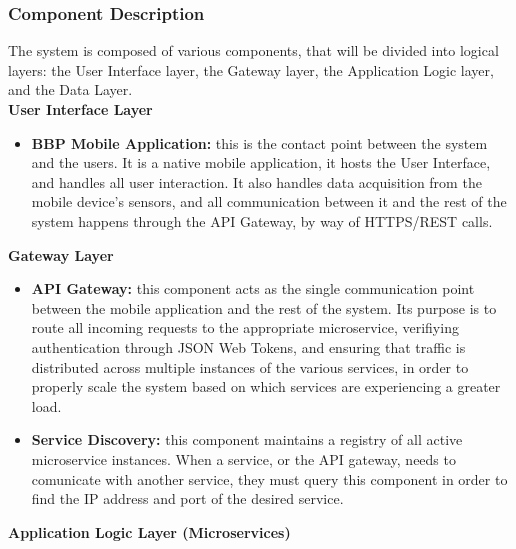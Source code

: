 \subsubsection{Component Description}
The system is composed of various components, that will be divided into logical layers: 
the User Interface layer, the Gateway layer, the Application Logic layer, and the Data Layer.\\
\newline
\textbf{User Interface Layer}
\begin{itemize}
    \item \textbf{BBP Mobile Application:} this is the contact point between the system and the users.
    It is a native mobile application, it hosts the User Interface, and handles all user interaction. It also handles data
    acquisition from the mobile device's sensors, and all communication between it and
    the rest of the system happens through the API Gateway, by way of HTTPS/REST calls.\\
\end{itemize}
\textbf{Gateway Layer}
\begin{itemize}
    \item \textbf{API Gateway:} this component acts as the single communication point
    between the mobile application and the rest of the system. Its purpose is to route
    all incoming requests to the appropriate microservice, verifiying authentication through
    JSON Web Tokens, and ensuring that traffic is distributed across multiple instances
    of the various services, in order to properly scale the system based on which services
    are experiencing a greater load.
    \item \textbf{Service Discovery:} this component maintains a registry of all active
    microservice instances. When a service, or the API gateway, needs to comunicate with 
    another service, they must query this component in order to find the IP address and
    port of the desired service.\\
\end{itemize}
\textbf{Application Logic Layer (Microservices)}
